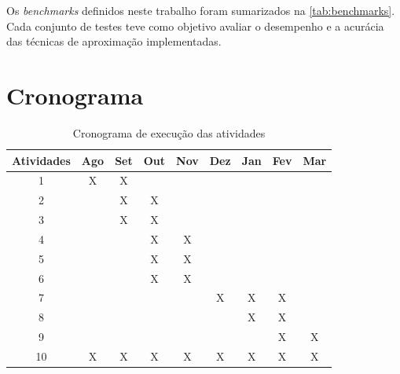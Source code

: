 Os \textit{benchmarks} definidos neste trabalho foram sumarizados na \autoref{tab:benchmarks}. Cada conjunto de testes teve como objetivo avaliar o desempenho e a acurácia das técnicas de aproximação implementadas.

\section{Cronograma}\label{sec:cronograma}

\begin{table}[htb]
	\centering
	\caption{Cronograma de execução das atividades}
	\begin{tabular}{|c|c|c|c|c|c|c|c|c|}
		\hline
		\textbf{Atividades} & \textbf{Ago} & \textbf{Set} & \textbf{Out} & \textbf{Nov} & \textbf{Dez} & \textbf{Jan} & \textbf{Fev} & \textbf{Mar} \\
		\hline
		1                   & X            & X            &              &              &              &              &              &              \\ \hline
		2                   &              & X            & X            &              &              &              &              &              \\ \hline
		3                   &              & X            & X            &              &              &              &              &              \\ \hline
		4                   &              &              & X            & X            &              &              &              &              \\ \hline
		5                   &              &              & X            & X            &              &              &              &              \\ \hline
		6                   &              &              & X            & X            &              &              &              &              \\ \hline
		7                   &              &              &              &              & X            & X            & X            &              \\ \hline
		8                   &              &              &              &              &              & X            & X            &              \\ \hline
		9                   &              &              &              &              &              &              & X            & X            \\ \hline
		10                  & X            & X            & X            & X            & X            & X            & X            & X            \\ \hline
	\end{tabular}
	\fonte{}
	\label{tab:cronograma}
\end{table}

